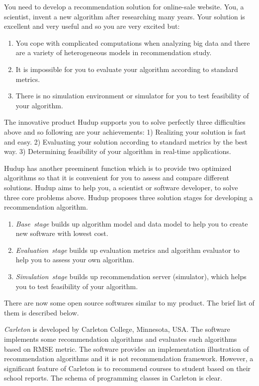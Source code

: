 \documentclass[a4paper]{llncs}
\begin{document}
You need to develop a recommendation solution for online-sale website. You, a scientist, invent a new algorithm after researching many years. Your solution is excellent and very useful and so you are very excited but:
\begin{enumerate}
\item You cope with complicated computations when analyzing big data and there are a variety of heterogeneous models in recommendation study.
\item It is impossible for you to evaluate your algorithm according to standard metrics.
\item There is no simulation environment or simulator for you to test feasibility of your algorithm.
\end{enumerate}
The innovative product Hudup supports you to solve perfectly three difficulties above and so following are your achievements: 1) Realizing your solution is fast and easy. 2) Evaluating your solution according to standard metrics by the best way. 3) Determining feasibility of your algorithm in real-time applications.

Hudup has another preeminent function which is to provide two optimized algorithms so that it is convenient for you to assess and compare different solutions. Hudup aims to help you, a scientist or software developer, to solve three core problems above. Hudup proposes three solution stages for developing a recommendation algorithm.
\begin{enumerate}
\item \textit{Base~stage} builds up algorithm model and data model to help you to create new software with lowest cost.
\item \textit{Evaluation~stage} builds up evaluation metrics and algorithm evaluator to help you to assess your own algorithm.
\item \textit{Simulation~stage} builds up recommendation server (simulator), which helps you to test feasibility of your algorithm.
\end{enumerate}
There are now some open source softwares similar to my product. The brief list of them is described below.

\textit{Carleton} \cite{carleton} is developed by Carleton College, Minnesota, USA. The software implements some recommendation algorithms and evaluates such algorithms based on RMSE metric. The software provides an implementation illustration of recommendation algorithms and it is not recommendation framework. However, a significant feature of Carleton is to recommend courses to student based on their school reports. The schema of programming classes in Carleton is clear.
\end{document}
